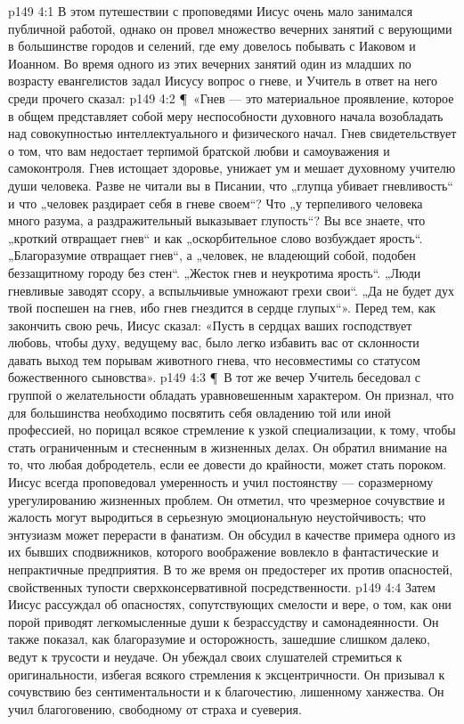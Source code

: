\vs p149 4:1 В этом путешествии с проповедями Иисус очень мало занимался публичной работой, однако он провел множество вечерних занятий с верующими в большинстве городов и селений, где ему довелось побывать с Иаковом и Иоанном. Во время одного из этих вечерних занятий один из младших по возрасту евангелистов задал Иисусу вопрос о гневе, и Учитель в ответ на него среди прочего сказал:
\vs p149 4:2 \P\ «Гнев --- это материальное проявление, которое в общем представляет собой меру неспособности духовного начала возобладать над совокупностью интеллектуального и физического начал. Гнев свидетельствует о том, что вам недостает терпимой братской любви и самоуважения и самоконтроля. Гнев истощает здоровье, унижает ум и мешает духовному учителю души человека. Разве не читали вы в Писании, что „глупца убивает гневливость“ и что „человек раздирает себя в гневе своем“? Что „у терпеливого человека много разума, а раздражительный выказывает глупость“? Вы все знаете, что „кроткий отвращает гнев“ и как „оскорбительное слово возбуждает ярость“. „Благоразумие отвращает гнев“, а „человек, не владеющий собой, подобен беззащитному городу без стен“. „Жесток гнев и неукротима ярость“. „Люди гневливые заводят ссору, а вспыльчивые умножают грехи свои“. „Да не будет дух твой поспешен на гнев, ибо гнев гнездится в сердце глупых“». Перед тем, как закончить свою речь, Иисус сказал: «Пусть в сердцах ваших господствует любовь, чтобы духу, ведущему вас, было легко избавить вас от склонности давать выход тем порывам животного гнева, что несовместимы со статусом божественного сыновства».
\vs p149 4:3 \P\ В тот же вечер Учитель беседовал с группой о желательности обладать уравновешенным характером. Он признал, что для большинства необходимо посвятить себя овладению той или иной профессией, но порицал всякое стремление к узкой специализации, к тому, чтобы стать ограниченным и стесненным в жизненных делах. Он обратил внимание на то, что любая добродетель, если ее довести до крайности, может стать пороком. Иисус всегда проповедовал умеренность и учил постоянству --- соразмерному урегулированию жизненных проблем. Он отметил, что чрезмерное сочувствие и жалость могут выродиться в серьезную эмоциональную неустойчивость; что энтузиазм может перерасти в фанатизм. Он обсудил в качестве примера одного из их бывших сподвижников, которого воображение вовлекло в фантастические и непрактичные предприятия. В то же время он предостерег их против опасностей, свойственных тупости сверхконсервативной посредственности.
\vs p149 4:4 Затем Иисус рассуждал об опасностях, сопутствующих смелости и вере, о том, как они порой приводят легкомысленные души к безрассудству и самонадеянности. Он также показал, как благоразумие и осторожность, зашедшие слишком далеко, ведут к трусости и неудаче. Он убеждал своих слушателей стремиться к оригинальности, избегая всякого стремления к эксцентричности. Он призывал к сочувствию без сентиментальности и к благочестию, лишенному ханжества. Он учил благоговению, свободному от страха и суеверия.
